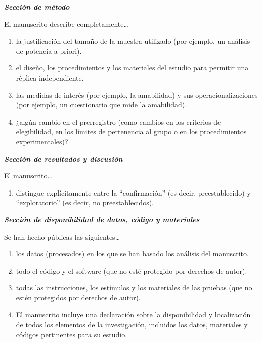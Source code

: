 \documentclass[
  spanish,
  a4paper,
  oneside]{scrbook}
\providecommand{\tightlist}{%
  \setlength{\itemsep}{0pt}\setlength{\parskip}{0pt}}
\begin{document}
\textbf{\emph{Sección de método}}

El manuscrito describe completamente\ldots{}

\begin{enumerate}
\def\labelenumi{(\arabic{enumi})}
\setcounter{enumi}{3}
\item
  la justificación del tamaño de la muestra utilizado (por ejemplo, un
  análisis de potencia a priori).
\item
  el diseño, los procedimientos y los materiales del estudio para
  permitir una réplica independiente.
\item
  las medidas de interés (por ejemplo, la amabilidad) y sus
  operacionalizaciones (por ejemplo, un cuestionario que mide la
  amabilidad).
\item
  ¿algún cambio en el prerregistro (como cambios en los criterios de
  elegibilidad, en los límites de pertenencia al grupo o en los
  procedimientos experimentales)?
\end{enumerate}

\textbf{\emph{Sección de resultados y discusión}}

El manuscrito\ldots{}

\begin{enumerate}
\def\labelenumi{(\arabic{enumi})}
\setcounter{enumi}{7}
\tightlist
\item
  distingue explícitamente entre la ``confirmación'' (es decir,
  preestablecido) y ``exploratorio'' (es decir, no preestablecidos).
\end{enumerate}

\textbf{\emph{Sección de disponibilidad de datos, código y materiales}}

Se han hecho públicas las siguientes\ldots{}

\begin{enumerate}
\def\labelenumi{(\arabic{enumi})}
\setcounter{enumi}{8}
\item
  los datos (procesados) en los que se han basado los análisis del
  manuscrito.
\item
  todo el código y el software (que no esté protegido por derechos de
  autor).
\item
  todas las instrucciones, los estímulos y los materiales de las pruebas
  (que no estén protegidos por derechos de autor).
\item
  El manuscrito incluye una declaración sobre la disponibilidad y
  localización de todos los elementos de la investigación, incluidos los
  datos, materiales y códigos pertinentes para su estudio.
\end{enumerate}
\end{document}
